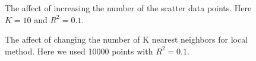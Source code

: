 \documentclass[12pt]{article}
\begin{document}
\begin{figure}[!tbh]
\centering        
   \caption{The affect of increasing the number of the scatter data points. Here $K=10$ and $R^{2} = 0.1$.}
   \label{fig:points1}
\end{figure}   
   	    
\begin{figure}[!tbh]
\centering        
   \caption{The affect of changing the number of K nearest neighbors for local method. Here we used 10000 points with $R^{2}=0.1$.}
   \label{fig:k1}
\end{figure} 	 	        
\end{document}
